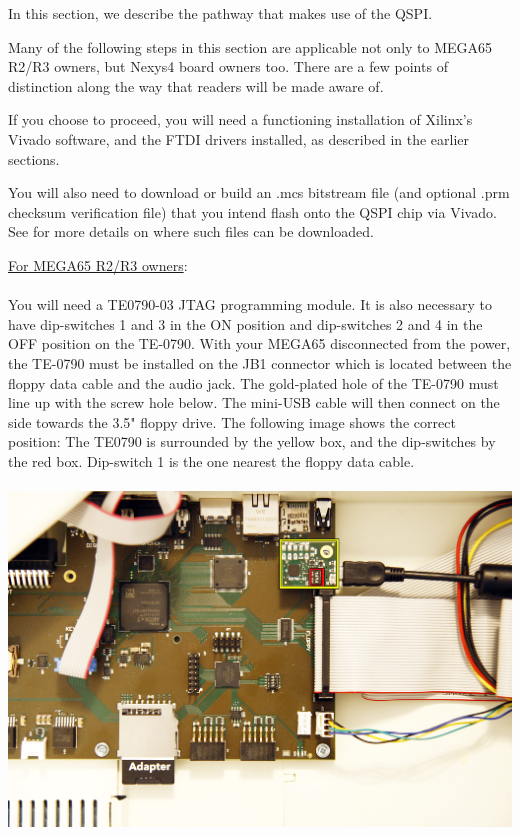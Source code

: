 In this section, we describe the pathway that makes use of the QSPI.

Many of the following steps in this section are applicable not only to MEGA65 R2/R3 owners, but Nexys4 board owners too. There are a few points of distinction along the way that readers will be made aware of.

If you choose to proceed, you will need a functioning installation of Xilinx's Vivado software, and the FTDI drivers installed, as described in the earlier sections.

You will also need to download or build an .mcs bitstream file (and optional .prm checksum verification file) that you intend flash onto the QSPI chip via Vivado. See  for more details on where such files can be downloaded.

\begin{tcolorbox}[colback=white,coltext=black]
\underline{For MEGA65 R2/R3 owners}:\\
\\
You will need a TE0790-03 JTAG programming module. It is also necessary to have
dip-switches 1 and 3 in the ON position and dip-switches 2 and 4 in the
OFF position on the TE-0790.
With your MEGA65 disconnected from the power, the TE-0790 must be
installed on the JB1 connector which is located between the floppy data cable and the audio jack.
The gold-plated hole of the TE-0790 must line up with the screw
hole below.  The mini-USB cable will then connect on the side towards the 3.5" floppy drive.
The following image shows the correct position: The TE0790 is surrounded by the yellow box,
and the dip-switches by the red box. Dip-switch 1 is the one nearest the floppy data cable. \\
\\
\includegraphics[width=\linewidth]{images/jtag_detail_02.jpg}
\end{tcolorbox}

